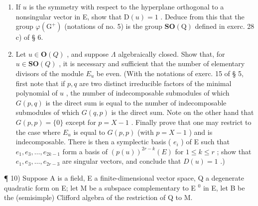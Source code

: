 \begin{enumerate}
\def\labelenumi{\alph{enumi})}
\setcounter{enumi}{3}
\item
  If \(u\) is the symmetry with respect to the hyperplane orthogonal to a nonsingular vector in E, show that \(\mathrm{D}(u)=1\) . Deduce from this that the group \(\varphi(\mathrm{G}^{+})\) (notations of no. 5) is the group \(\mathbf{SO}(\mathrm{Q})\) defined in exerc. 28 c) of § 6.
\item
  Let \(u \in \mathbf{O}(Q)\) , and suppose \(\Lambda\) algebraically closed. Show that, for \(u \in \mathbf{SO}(Q)\) , it is necessary and sufficient that the number of elementary divisors of the module \(E_u\) be even. (With the notations of exerc. 15 of § 5, first note that if \(p, q\) are two distinct irreducible factors of the minimal polynomial of \(u\) , the number of indecomposable submodules of which \(G(p, q)\) is the direct sum is equal to the number of indecomposable submodules of which \(G(q, p)\) is the direct sum. Note on the other hand that \(G(p, p) = \{0\}\) except for \(p = X - 1\) . Finally prove that one may restrict to the case where \(E_u\) is equal to \(G(p, p)\) (with \(p = X - 1\) ) and is indecomposable. There is then a symplectic basis ( \(e_i\) ) of E such that \(e_1, e_3, \ldots, e_{2k-1}\) form a basis of \((p(u))^{2r-k}(E)\) for \(1 \leqslant k \leqslant r\) ; show that \(e_1, e_3, \ldots, e_{2r-3}\) are singular vectors, and conclude that \(D(u) = 1\) .)
\end{enumerate}

¶ 10) Suppose A is a field, E a finite-dimensional vector space, Q a degenerate quadratic form on E; let M be a subspace complementary to E \(^{0}\) in E, let B be the (semisimple) Clifford algebra of the restriction of Q to M.

